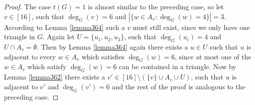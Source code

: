 \begin{thm}
\begin{proof}
The case \(t(G)=1\) is almost similar to the preceding case, so let \(v\in [16]\), such that \(\deg_G(v)=6\) and \(|\{w\in A_v:\deg_G(w)=4\}|=3\). According to Lemma \ref{lemma364} such a \(v\) must still exist, since we only have one triangle in \(G\). Again let \(U=\{u_1,u_2,u_3\}\), such that \(\deg_G(u_i)=4\) and \(U\cap A_v=\emptyset\). Then by Lemma \ref{lemma364} again there exists a \(u\in U\) such that \(u\) is adjacent to every \(w\in A_v\) which satisfies \(\deg_G(w)=6\), since at most one of the \(w\in A_v\) which satisfy \(\deg_G(w)=6\) can be contained in a triangle. Now by Lemma \ref{lemma362} there exists a \(v'\in [16]\setminus (\{v\}\cup A_v\cup U)\), such that \(u\) is adjacent to \(v'\) and \(\deg_G(v')=6\) and the rest of the proof is analogous to the preceding case.



\end{proof}
\end{thm}